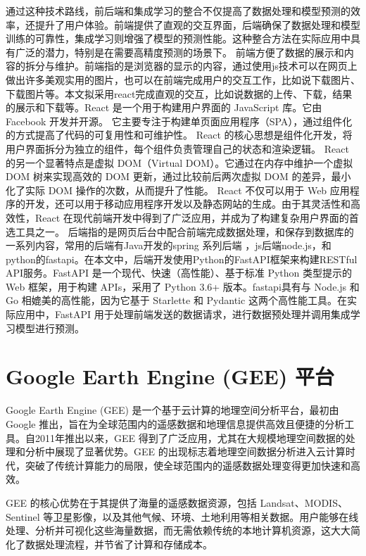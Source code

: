 \documentclass[AutoFakeBold]{LZUThesis-PgD&PhD}
\begin{document}
通过这种技术路线，前后端和集成学习的整合不仅提高了数据处理和模型预测的效率，还提升了用户体验。前端提供了直观的交互界面，后端确保了数据处理和模型训练的可靠性，集成学习则增强了模型的预测性能。这种整合方法在实际应用中具有广泛的潜力，特别是在需要高精度预测的场景下。
前端方便了数据的展示和内容的拆分与维护。前端指的是浏览器的显示的内容，通过使用js技术可以在网页上做出许多美观实用的图片，也可以在前端完成用户的交互工作，比如说下载图片、下载图片等。本文拟采用react完成直观的交互，比如说数据的上传、下载，结果的展示和下载等。React 是一个用于构建用户界面的 JavaScript 库。它由 Facebook 开发并开源。
它主要专注于构建单页面应用程序（SPA），通过组件化的方式提高了代码的可复用性和可维护性。 React 的核心思想是组件化开发，将用户界面拆分为独立的组件，每个组件负责管理自己的状态和渲染逻辑。 React 的另一个显著特点是虚拟 DOM（Virtual DOM）。它通过在内存中维护一个虚拟 DOM 树来实现高效的 DOM 更新，通过比较前后两次虚拟 DOM 的差异，最小化了实际 DOM 操作的次数，从而提升了性能。 React 不仅可以用于 Web 应用程序的开发，还可以用于移动应用程序开发以及静态网站的生成。由于其灵活性和高效性，React 在现代前端开发中得到了广泛应用，并成为了构建复杂用户界面的首选工具之一。
后端指的是网页后台中配合前端完成数据处理，和保存到数据库的一系列内容，常用的后端有Java开发的spring 系列后端 ，js后端node.js，和python的fastapi。在本文中，后端开发使用Python的FastAPI框架来构建RESTful API服务。FastAPI 是一个现代、快速（高性能）、基于标准 Python 类型提示的 Web 框架，用于构建 APIs，采用了 Python 3.6+ 版本。fastapi具有与 Node.js 和 Go 相媲美的高性能，因为它基于 Starlette 和 Pydantic 这两个高性能工具。在实际应用中，FastAPI 用于处理前端发送的数据请求，进行数据预处理并调用集成学习模型进行预测。


\section{Google Earth Engine (GEE) 平台}

Google Earth Engine (GEE) 是一个基于云计算的地理空间分析平台，最初由 Google 推出，旨在为全球范围内的遥感数据和地理信息提供高效且便捷的分析工具。自2011年推出以来，GEE 得到了广泛应用，尤其在大规模地理空间数据的处理和分析中展现了显著优势。GEE 的出现标志着地理空间数据分析进入云计算时代，突破了传统计算能力的局限，使全球范围内的遥感数据处理变得更加快速和高效。

GEE 的核心优势在于其提供了海量的遥感数据资源，包括 Landsat、MODIS、Sentinel 等卫星影像，以及其他气候、环境、土地利用等相关数据。用户能够在线处理、分析并可视化这些海量数据，而无需依赖传统的本地计算机资源，这大大简化了数据处理流程，并节省了计算和存储成本。
\end{document}
